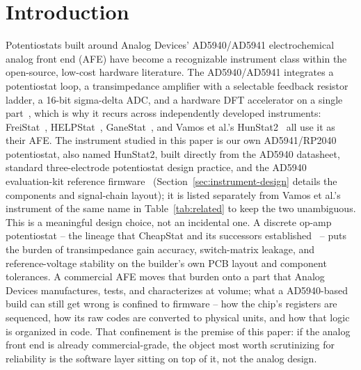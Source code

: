 \section{Introduction}
\label{sec:intro}

Potentiostats built around Analog Devices' AD5940/AD5941 electrochemical
analog front end (AFE) have become a recognizable instrument class within
the open-source, low-cost hardware literature. The AD5940/AD5941 integrates
a potentiostat loop, a transimpedance amplifier with a selectable feedback
resistor ladder, a 16-bit sigma-delta ADC, and a hardware DFT accelerator on
a single part~\cite{devices2024ad5940}, which is why it recurs across
independently developed instruments: FreiStat~\cite{bill2023electrochemical},
HELPStat~\cite{bautista2025helpstat}, GaneStat~\cite{anshori2025ganestat},
and Vamos et al.'s HunStat2~\cite{vamos2025hunstat2} all use it as their AFE.
The instrument studied in this paper is our own AD5941/RP2040 potentiostat,
also named HunStat2, built directly from the AD5940 datasheet, standard
three-electrode potentiostat design practice, and the AD5940 evaluation-kit
reference firmware~\cite{ad5940_eis_github} (Section~\ref{sec:instrument-design}
details the components and signal-chain layout); it is listed separately
from Vamos et al.'s instrument of the same name in
Table~\ref{tab:related} to keep the two unambiguous. This is a meaningful
design choice, not an incidental one.
A discrete op-amp potentiostat -- the lineage that CheapStat and its
successors established~\cite{rowe2011cheapstat} -- puts the burden of
transimpedance gain accuracy, switch-matrix leakage, and reference-voltage
stability on the builder's own PCB layout and component tolerances. A
commercial AFE moves that burden onto a part that Analog Devices
manufactures, tests, and characterizes at volume; what a AD5940-based build
can still get wrong is confined to firmware -- how the chip's registers are
sequenced, how its raw codes are converted to physical units, and how that
logic is organized in code. That confinement is the premise of this paper:
if the analog front end is already commercial-grade, the object most worth
scrutinizing for reliability is the software layer sitting on top of it, not
the analog design.

